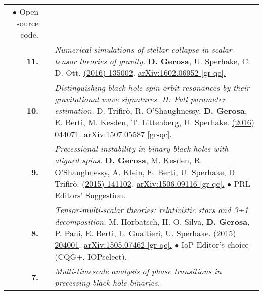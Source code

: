 {\begin{longtable}{rp{0.3cm}p{15.8cm}}
\textcolor{color1}{$\bullet$} Open source code.
\vspace{0.09cm}\\
%
\textbf{11.} & & \textit{Numerical simulations of stellar collapse in scalar-tensor theories of gravity.}
\newline{}
\textbf{D. Gerosa}, U. Sperhake, C. D. Ott.
\newline{}
\href{http://dx.doi.org/10.1088/0264-9381/33/13/135002}{\cqg 33 (2016) 135002}. \href{https://arxiv.org/abs/1602.06952}{arXiv:1602.06952 [gr-qc].}
\vspace{0.09cm}\\
%
\textbf{10.} & & \textit{Distinguishing black-hole spin-orbit resonances by their gravitational wave signatures. II: Full parameter estimation.}
\newline{}
D. Trifir\`o, R. O'Shaughnessy, \textbf{D. Gerosa}, E. Berti, M. Kesden, T. Littenberg, U. Sperhake.
\newline{}
\href{http://dx.doi.org/10.1103/PhysRevD.93.044071}{\prd 93 (2016) 044071}. \href{https://arxiv.org/abs/1507.05587}{arXiv:1507.05587 [gr-qc].}
\vspace{0.09cm}\\
%
\textbf{9.} & & \textit{Precessional instability in binary black holes with aligned spins.}
\newline{}
\textbf{D. Gerosa}, M. Kesden, R. O'Shaughnessy, A. Klein, E. Berti, U. Sperhake, D. Trifir\`o.
\newline{}
\href{http://dx.doi.org/10.1103/PhysRevLett.115.141102}{\prl 115 (2015) 141102}. \href{https://arxiv.org/abs/1506.09116}{arXiv:1506.09116 [gr-qc].}
\newline{}
\textcolor{color1}{$\bullet$} PRL Editors' Suggestion.
\vspace{0.09cm}\\
%
\textbf{8.} & & \textit{Tensor-multi-scalar theories: relativistic stars and 3+1 decomposition.}
\newline{}
M. Horbatsch, H. O. Silva, \textbf{D. Gerosa}, P. Pani,  E. Berti, L. Gualtieri, U. Sperhake.
\newline{}
\href{http://dx.doi.org/10.1088/0264-9381/32/20/204001}{\cqg 32 (2015) 204001}. \href{https://arxiv.org/abs/1505.07462}{arXiv:1505.07462 [gr-qc].}
\newline{}
\textcolor{color1}{$\bullet$} IoP Editor's choice (CQG+, IOPselect).
\vspace{0.09cm}\\
%
\textbf{7.} & & \textit{Multi-timescale analysis of phase transitions in precessing black-hole binaries.}

\end{longtable}}
